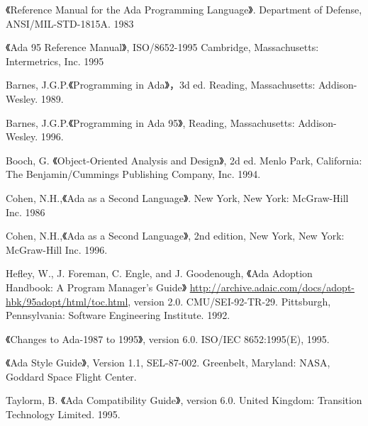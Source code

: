 %
%
%

\cleardoublepage
{}
\begin{thebibliography}{widest-label}\label{bib}

 《Reference Manual for the Ada Programming
Language》. Department of Defense, ANSI/MIL-STD-1815A. 1983

 《Ada 95 Reference Manual》,
ISO/8652-1995 Cambridge, Massachusetts: Intermetrics, Inc. 1995

 Barnes, J.G.P.《Programming in Ada》，3d ed.
Reading, Massachusetts: Addison-Wesley. 1989.

 Barnes, J.G.P.《Programming in Ada 95》,
Reading, Massachusetts: Addison-Wesley. 1996.

 Booch, G. 《Object-Oriented Analysis and
Design》, 2d ed. Menlo Park, California: The Benjamin/Cummings Publishing
Company, Inc. 1994.

 Cohen, N.H.,《Ada as a Second Language》.
 New York, New York: McGraw-Hill Inc. 1986

 Cohen, N.H.,《Ada as a Second Language》,
2nd edition, New York, New York: McGraw-Hill Inc. 1996.

 Hefley, W., J. Foreman, C. Engle, and
J. Goodenough, 《Ada Adoption Handbook: A Program Manager's Guide》
\url{http://archive.adaic.com/docs/adopt-hbk/95adopt/html/toc.html},
version 2.0. CMU/SEI-92-TR-29. Pittsburgh, Pennsylvania:
Software Engineering Institute. 1992.

 《Changes to Ada-1987 to 1995》,
version 6.0. ISO/IEC 8652:1995(E), 1995.

 《Ada Style Guide》, Version 1.1, SEL-87-002. Greenbelt, Maryland: NASA, Goddard Space Flight Center.

 Taylorm, B.
《Ada Compatibility Guide》, version 6.0. United Kingdom:
Transition Technology Limited. 1995.


\end{thebibliography}
